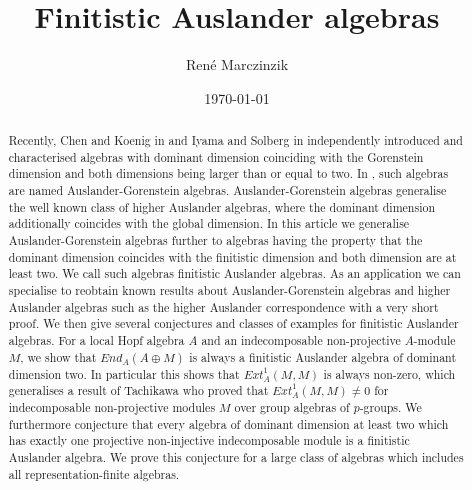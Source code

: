 \documentclass[a4paper]{amsart}
\theoremstyle{definition}
\theoremstyle{remark}
\numberwithin{equation}{theorem}
\begin{document}
\title{Finitistic Auslander algebras}
\date{\today}




\author{Ren\'{e} Marczinzik}
\address{Institute of algebra and number theory, University of Stuttgart, Pfaffenwaldring 57, 70569 Stuttgart, Germany}

\begin{abstract}
Recently, Chen and Koenig in \cite{CheKoe} and Iyama and Solberg in \cite{IyaSol} independently introduced and characterised algebras with dominant dimension coinciding with the Gorenstein dimension and both dimensions being larger than or equal to two. In \cite{IyaSol}, such algebras are named Auslander-Gorenstein algebras. Auslander-Gorenstein algebras generalise the well known class of higher Auslander algebras, where the dominant dimension additionally coincides with the global dimension. In this article we generalise Auslander-Gorenstein algebras further to algebras having the property that the dominant dimension coincides with the finitistic dimension and both dimension are at least two. We call such algebras finitistic Auslander algebras. As an application we can specialise to reobtain known results about Auslander-Gorenstein algebras and higher Auslander algebras such as the higher Auslander correspondence with a very short proof.
We then give several conjectures and classes of examples for finitistic Auslander algebras.
For a local Hopf algebra $A$ and an indecomposable non-projective $A$-module $M$, we show that $End_A(A \oplus M)$ is always a finitistic Auslander algebra of dominant dimension two. In particular this shows that $Ext_A^1(M,M)$ is always non-zero, which generalises a result of Tachikawa who proved that $Ext_A^1(M,M) \neq 0$ for indecomposable non-projective modules $M$ over group algebras of $p$-groups.
We furthermore conjecture that every algebra of dominant dimension at least two which has exactly one projective non-injective indecomposable module is a finitistic Auslander algebra. We prove this conjecture for a large class of algebras which includes all representation-finite algebras.
\end{abstract}

\maketitle
\end{document}
